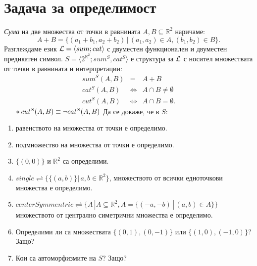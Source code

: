 \documentclass[]{article}
\begin{document}
\newpage
\section{Задача за определимост}
\paragraph{}
\emph{Сума} на две множества от точки в равнината $A, B\subseteq \mathbb{R}^2$ наричаме:
\begin{equation*}
A+B = \{(a_1+b_1,a_2+b_2) \,|\, (a_1,a_2)\in A, (b_1,b_2)\in B\}.
\end{equation*}
Разглеждаме език ${\cal L}=\langle sum;cat\rangle$ с двуместен функционален и двуместен предикатен
символ. $S=\langle2^{\mathbb{R}^2}; sum^S,cat^S\rangle$ е структура за ${\cal L}$ с носител множествата
от точки в равнината и интерпретации:
\begin{eqnarray*}
sum^S(A,B) &=& A + B\\
cat^S(A,B) &\iff & A\cap B\neq \emptyset\\
cut^S(A,B) &\iff & A\cap B = \emptyset.
\end{eqnarray*}
$\indent *cut^S(A,B) \equiv \neg cat^S(A,B)\\$
Да се докаже, че в $S$:
\begin{enumerate}
\item равенството на множества от точки е определимо.
\item подмножество на множества от точки е определимо.
\item $\{(0,0)\}$ и $\mathbb{R}^2$ са определими.
\item $single \rightleftharpoons \{\{(a,b)\}|\,a,b \in \mathbb{R}^2\}$, множеството от всички едноточкови множества е определимо.
\item $centerSymmentric \rightleftharpoons \{A\,|A \subseteq \mathbb{R}^2, A = \{(-a, -b)\,|\,(a,b)\in A\}\}$ множеството от централно симетрични множества е определимо.
\item Определими ли са множествата $\{(0,1),(0,-1)\}$ или $\{(1,0),(-1,0)\}$? Защо? 
\item Кои са автоморфизмите на $S$? Защо?
\end{enumerate}
\newpage
\end{document}
